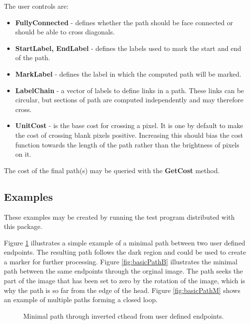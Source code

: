 \documentclass{InsightArticle}
\begin{document}
The user controls are:
\begin{itemize}
\item {\bf FullyConnected} - defines whether the path should be face connected or should be able to cross diagonals.
\item {\bf StartLabel, EndLabel} - defines the labels used to mark the start and end of the path.
\item {\bf MarkLabel} - defines the label in which the computed path will be marked.
\item {\bf LabelChain} - a vector of labels to define links in a path. These links can be circular, but sections of path are computed independently and may therefore cross.
\item {\bf UnitCost} - is the base cost for crossing a pixel. It is one by default to make the cost of crossing blank pixels positive. Increasing this should bias the cost function towards the length of the path rather than the brightness of pixels on it.
\end{itemize}

The cost of the final path(s) may be queried with the {\bf GetCost} method.

\subsection{Examples}
These examples may be created by running the test program distributed with this package.

Figure \ref{fig:basicPath} illustrates a simple example of a minimal
path between two user defined endpoints. The resulting path follows
the dark region and could be used to create a marker for further
processing. Figure \ref{fig:basicPathB} illustrates the minimal path
between the same endpoints through the orginal image. The path seeks
the part of the image that has been set to zero by the rotation of the
image, which is why the path is so far from the edge of the
head. Figure \ref{fig:basicPathM} shows an example of multiple paths
forming a closed loop.

\begin{figure}[htbp]
\begin{center}
\caption{Minimal path through inverted cthead from user defined endpoints.\label{fig:basicPath}}
\end{center}
\end{figure}
\end{document}
